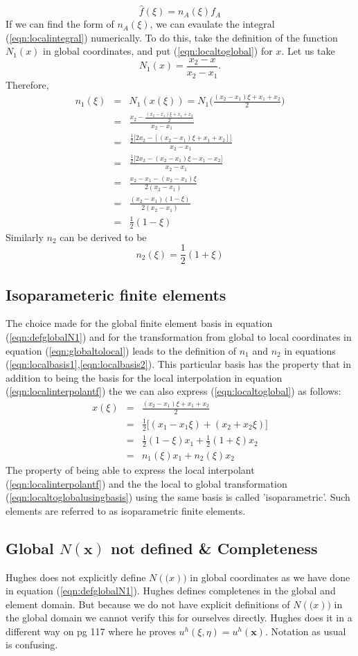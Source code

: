 \documentclass{article}
\newcommand{\beq}{\begin{equation}}
\newcommand{\eeq}{\end{equation}}
\newcommand{\ber}{\begin{eqnarray}}
\newcommand{\eer}{\end{eqnarray}}
\begin{document}
\beq
\label{eqn:localinterpolantf}
\hat{f}(\xi) = n_A(\xi)f_A
\eeq
If we can find the form of $n_A(\xi)$, we can evaulate the integral (\ref{eqn:localintegral}) numerically. To do this, take the definition of the function $N_1(x)$ in global coordinates, and put (\ref{eqn:localtoglobal}) for $x$. Let us take
\beq
\label{eqn:defglobalN1}
N_1(x) = \frac{x_2 - x}{x_2 - x_1}.
\eeq
Therefore,
\ber
n_1(\xi)&=&N_1(x(\xi)) = N_1\Big(\frac{(x_2 - x_1)\xi + x_1 + x_2}{2}\Big) \nonumber \\
        &=& \frac{x_2 - \frac{(x_2-x_1)\xi + x_1 + x_2}{2}}{x_2-x_1} \nonumber \\
        &=& \frac{\frac{1}{2}\Big[2x_2-[(x_2-x_1)\xi + x_1 + x_2]\Big]}{x_2-x_1} \nonumber \\
        &=& \frac{\frac{1}{2}\Big[2x_2-(x_2-x_1)\xi - x_1 - x_2\Big]}{x_2-x_1} \nonumber \\
        &=& \frac{x_2 - x_1 - (x_2-x_1)\xi}{2(x_2 - x_1)} \nonumber \\
        &=& \frac{(x_2-x_1)(1-\xi)}{2(x_2 - x_1)} \nonumber \\
        &=& \frac{1}{2}(1-\xi) \label{eqn:localbasis1}
\eer
Similarly $n_2$ can be derived to be
\beq
\label{eqn:localbasis2}
n_2(\xi) = \frac{1}{2}(1+\xi)
\eeq
\subsection{Isoparameteric finite elements}
The choice made for the global finite element basis in equation (\ref{eqn:defglobalN1}) and for the transformation from global to local coordinates in equation (\ref{eqn:globaltolocal}) leads to the definition of $n_1$ and $n_2$ in equations (\ref{eqn:localbasis1},\ref{eqn:localbasis2}). This particular basis has the property that in addition to being the basis for the local interpolation in equation (\ref{eqn:localinterpolantf}) the we can also express (\ref{eqn:localtoglobal}) as follows:
\ber
x(\xi) &=& \frac{(x_2 - x_1)\xi + x_1 + x_2}{2} \nonumber \\
       &=& \frac{1}{2}\Big[(x_1 - x_1\xi) + (x_2 + x_2\xi)\Big] \nonumber \\
       &=& \frac{1}{2}(1-\xi)x_1 + \frac{1}{2}(1+\xi)x_2 \nonumber \\
       &=& n_1(\xi)x_1 + n_2(\xi)x_2 \label{eqn:localtoglobalusingbasis}
\eer
The property of being able to express the local interpolant (\ref{eqn:localinterpolantf}) and the the local to global transformation (\ref{eqn:localtoglobalusingbasis}) using the same basis is called 'isoparametric'. Such elements are referred to as isoparametric finite elements.
\subsection{Global $N(\mathbf{x})$ not defined \& Completeness}
Hughes does not explicitly define $N(\mathbf(x))$ in global coordinates as we have done in equation (\ref{eqn:defglobalN1}). Hughes defines completenes in the global and element domain. But because we do not have explicit definitions of $N(\mathbf(x))$ in the global domain we cannot verify this for ourselves directly. Hughes does it in a different way on pg 117 where he proves $u^h(\xi,\eta)=u^h(\mathbf{x})$. Notation as usual is confusing.
\end{document}

